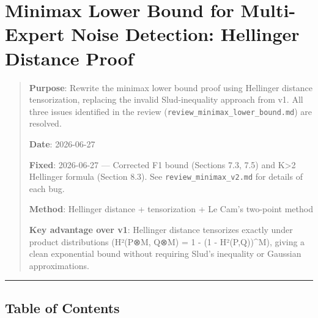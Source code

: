\documentclass[
  12pt,
]{article}
\author{SCX}
\date{2026}
\begin{document}
\section{Minimax Lower Bound for Multi-Expert Noise Detection: Hellinger
Distance
Proof}\label{minimax-lower-bound-for-multi-expert-noise-detection-hellinger-distance-proof}

\begin{quote}
\textbf{Purpose}: Rewrite the minimax lower bound proof using Hellinger
distance tensorization, replacing the invalid Slud-inequality approach
from v1. All three issues identified in the review
(\texttt{review\_minimax\_lower\_bound.md}) are resolved.

\textbf{Date}: 2026-06-27

\textbf{Fixed}: 2026-06-27 --- Corrected F1 bound (Sections 7.3, 7.5)
and K\textgreater2 Hellinger formula (Section 8.3). See
\texttt{review\_minimax\_v2.md} for details of each bug.

\textbf{Method}: Hellinger distance + tensorization + Le Cam's two-point
method

\textbf{Key advantage over v1}: Hellinger distance tensorizes exactly
under product distributions (H²(P⊗M, Q⊗M) = 1 - (1 - H²(P,Q))\^{}M),
giving a clean exponential bound without requiring Slud's inequality or
Gaussian approximations.
\end{quote}

\begin{center}\rule{0.5\linewidth}{0.5pt}\end{center}

\subsection{Table of Contents}\label{table-of-contents}
\end{document}
